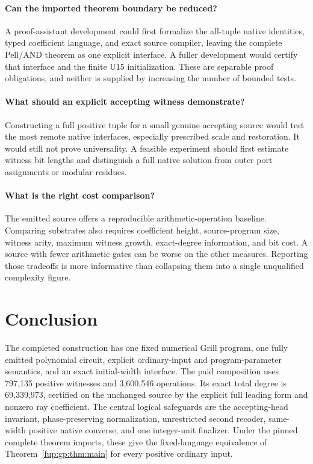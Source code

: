 \documentclass[11pt,letterpaper]{article}
\theoremstyle{definition}\newtheorem{definition}[theorem]{Definition}
\theoremstyle{remark}\newtheorem{remark}[theorem]{Remark}
\begin{document}
\paragraph{Can the imported theorem boundary be reduced?}
A proof-assistant development could first formalize the all-tuple native identities, typed coefficient language, and exact source compiler, leaving the complete Pell/AND theorem as one explicit interface. A fuller development would certify that interface and the finite U15 initialization. These are separable proof obligations, and neither is supplied by increasing the number of bounded tests.

\paragraph{What should an explicit accepting witness demonstrate?}
Constructing a full positive tuple for a small genuine accepting source would test the most remote native interfaces, especially prescribed scale and restoration. It would still not prove universality. A feasible experiment should first estimate witness bit lengths and distinguish a full native solution from outer port assignments or modular residues.

\paragraph{What is the right cost comparison?}
The emitted source offers a reproducible arithmetic-operation baseline. Comparing substrates also requires coefficient height, source-program size, witness arity, maximum witness growth, exact-degree information, and bit cost. A source with fewer arithmetic gates can be worse on the other measures. Reporting those tradeoffs is more informative than collapsing them into a single unqualified complexity figure.

\section*{Conclusion}
The completed construction has one fixed numerical Grill program, one fully emitted polynomial circuit, explicit ordinary-input and program-parameter semantics, and an exact initial-width interface. The paid composition uses 797,135 positive witnesses and 3,600,546 operations. Its exact total degree is 69,339,973, certified on the unchanged source by the explicit full leading form and nonzero ray coefficient. The central logical safeguards are the accepting-head invariant, phase-preserving normalization, unrestricted second recoder, same-width positive native converse, and one integer-unit finalizer. Under the pinned complete theorem imports, these give the fixed-language equivalence of Theorem~\ref{fup:gp:thm:main} for every positive ordinary input.
\end{document}
